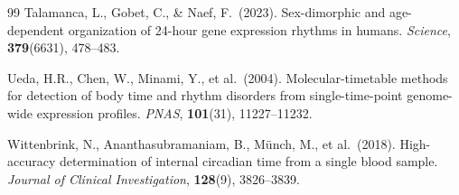 \documentclass[10pt,a4paper]{article}
\begin{document}
\begin{thebibliography}{99}
Talamanca, L., Gobet, C., \& Naef, F.\ (2023).
Sex-dimorphic and age-dependent organization of 24-hour gene
expression rhythms in humans.
\emph{Science}, \textbf{379}(6631), 478--483.

Ueda, H.R., Chen, W., Minami, Y., et al.\ (2004).
Molecular-timetable methods for detection of body time and rhythm
disorders from single-time-point genome-wide expression profiles.
\emph{PNAS}, \textbf{101}(31), 11227--11232.

Wittenbrink, N., Ananthasubramaniam, B., Münch, M., et al.\ (2018).
High-accuracy determination of internal circadian time from a single
blood sample.
\emph{Journal of Clinical Investigation}, \textbf{128}(9),
3826--3839.


\end{thebibliography}
\end{document}
